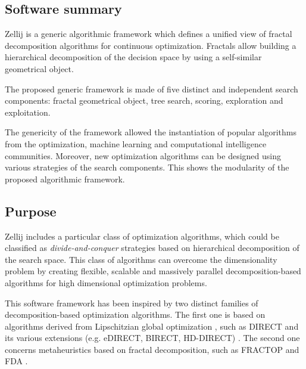 \subsection{Software summary}
\label{sec:Zellij:summary}

Zellij is a generic algorithmic framework which defines a unified view of fractal decomposition algorithms for continuous optimization. Fractals allow building a hierarchical decomposition of the decision space by using a self-similar geometrical object. 

The proposed generic framework is made of five distinct and independent search components: fractal geometrical object, tree search, scoring, exploration and exploitation. 

The genericity of the framework allowed the instantiation of popular algorithms from the optimization, machine learning and computational intelligence communities. Moreover, new optimization algorithms can be designed using various strategies of the search components. This shows the modularity of the proposed algorithmic framework.


\subsection{Purpose}
\label{sec:Zellij:purpose}

Zellij includes a particular class of optimization algorithms, which could be classified as \textit{divide-and-conquer} strategies based on hierarchical decomposition of the search space. This class of algorithms can overcome the dimensionality problem by creating flexible, scalable and massively parallel decomposition-based algorithms for high dimensional optimization problems.

This software framework has been inspired by two distinct families of decomposition-based optimization algorithms. The first one is based on algorithms derived from Lipschitzian global optimization \cite{direct}, such as DIRECT and its various extensions (e.g. eDIRECT, BIRECT, HD-DIRECT) \cite{direct_survey}. The second one concerns metaheuristics based on fractal decomposition, such as FRACTOP \cite{fractop} and FDA \cite{fda1}.

